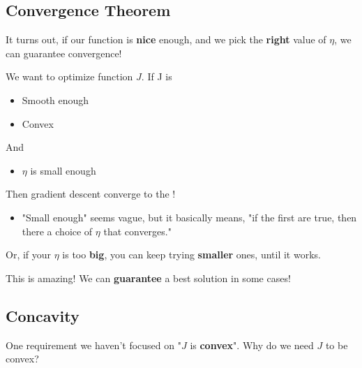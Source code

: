     \subsection{Convergence Theorem}
    
        It turns out, if our function is \textbf{nice} enough, and we pick the \textbf{right} value of $\eta$, we can guarantee convergence!\\
        
        \begin{theorem}
        
            We want to optimize function $J$. If J is 
            \begin{itemize}
                \item Smooth enough
                \item Convex
            \end{itemize}
            
            And
            
            \begin{itemize}
                \item $\eta$ is small enough
            \end{itemize}
            
            Then gradient descent  converge to the !

            \subsecdiv

            \begin{itemize}
                \item "Small enough" seems vague, but it basically means, "if the first  are true, then there  a choice of $\eta$ that converges."
            \end{itemize}
        \end{theorem}
        
        Or, if your $\eta$ is too \textbf{big}, you can keep trying \textbf{smaller} ones, until it works. 
        
        This is amazing! We can \textbf{guarantee} a best solution in some cases!
        
    \subsection{Concavity}
    
        One requirement we haven't focused on "$J$ is \textbf{convex}". Why do we need $J$ to be convex?
        
